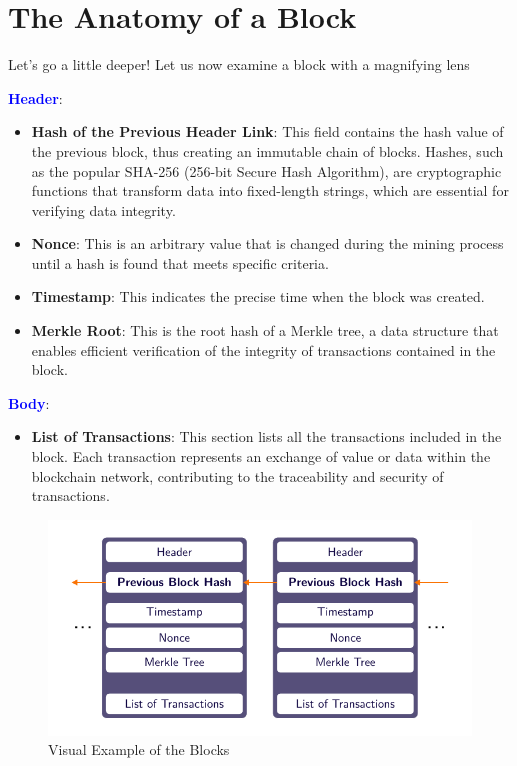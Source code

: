 \section{The Anatomy of a Block}

Let's go a little deeper! Let us now examine a block with a magnifying lens  \faSearch

\textbf{\textcolor{Blue}{Header}}:
\begin{itemize}
    \item \textbf{Hash of the Previous Header Link}: This field contains the hash value of the previous block, thus creating an immutable chain of blocks. Hashes, such as the popular SHA-256 (256-bit Secure Hash Algorithm), are cryptographic functions that transform data into fixed-length strings, which are essential for verifying data integrity.
    \item \textbf{Nonce}: This is an arbitrary value that is changed during the mining process until a hash is found that meets specific criteria.
    \item \textbf{Timestamp}: This indicates the precise time when the block was created.
    \item \textbf{Merkle Root}: This is the root hash of a Merkle tree, a data structure that enables efficient verification of the integrity of transactions contained in the block.
\end{itemize}


\textbf{\textcolor{Blue}{Body}}:
\begin{itemize}
    \item \textbf{List of Transactions}: This section lists all the transactions included in the block. Each transaction represents an exchange of value or data within the blockchain network, contributing to the traceability and security of transactions.
\end{itemize}

\begin{figure}[hb]
\centering\includegraphics[scale=1.2]{tikz/chapter2 - Blocks.pdf}
\caption{Visual Example of the Blocks}
\end{figure}
